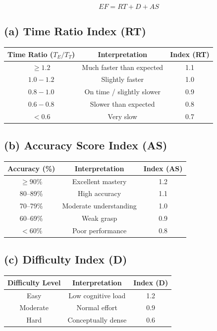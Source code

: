 \documentclass[11pt]{article}
\begin{document}
\begin{equation}
EF = RT + D + AS
\end{equation}

\subsection*{(a) Time Ratio Index (RT)}
\begin{tabular}{ccc}
\toprule
Time Ratio (\(T_E/T_T\)) & Interpretation & Index (RT) \\
\midrule
\(\ge 1.2\) & Much faster than expected & 1.1 \\
\(1.0 - 1.2\) & Slightly faster & 1.0 \\
\(0.8 - 1.0\) & On time / slightly slower & 0.9 \\
\(0.6 - 0.8\) & Slower than expected & 0.8 \\
\(< 0.6\) & Very slow & 0.7 \\
\bottomrule
\end{tabular}

\subsection*{(b) Accuracy Score Index (AS)}
\begin{tabular}{ccc}
\toprule
Accuracy (\%) & Interpretation & Index (AS) \\
\midrule
\(\ge 90\%\) & Excellent mastery & 1.2 \\
80--89\% & High accuracy & 1.1 \\
70--79\% & Moderate understanding & 1.0 \\
60--69\% & Weak grasp & 0.9 \\
\(< 60\%\) & Poor performance & 0.8 \\
\bottomrule
\end{tabular}

\subsection*{(c) Difficulty Index (D)}
\begin{tabular}{ccc}
\toprule
Difficulty Level & Interpretation & Index (D) \\
\midrule
Easy & Low cognitive load & 1.2 \\
Moderate & Normal effort & 0.9 \\
Hard & Conceptually dense & 0.6 \\
\bottomrule
\end{tabular}
\end{document}
